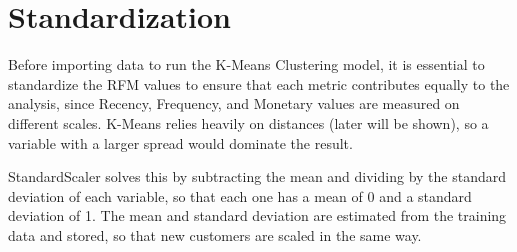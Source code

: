 \section{Standardization}

Before importing data to run the K-Means Clustering model, it is essential to standardize the RFM values to ensure that
each metric contributes equally to the analysis, since Recency, Frequency, and Monetary values are measured on
different scales. K-Means relies heavily on distances (later will be shown), so a variable with a larger spread would
dominate the result.

StandardScaler solves this by subtracting the mean and dividing by the standard deviation of each variable, so that
each one has a mean of 0 and a standard deviation of 1. The mean and standard deviation are estimated from the training
data and stored, so that new customers are scaled in the same way.

